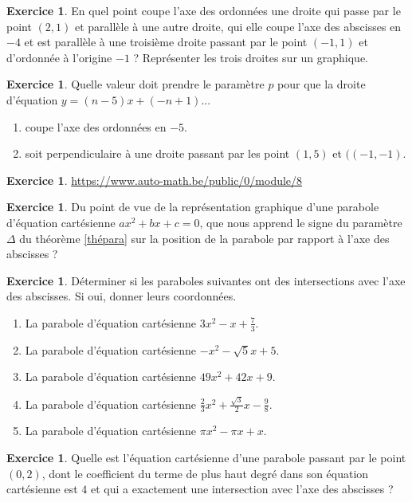\documentclass[a4paper,13pt]{scrreprt}
\theoremstyle{plain}
\theoremstyle{definition}
\newtheorem{exo}[subsection]{Exercice}
\begin{document}
\begin{exo} \label{exop6}
	En quel point coupe l'axe des ordonnées une droite qui passe par le point $(2,1)$ et parallèle à une autre droite, qui elle coupe l'axe des abscisses en $-4$ et est parallèle à une troisième droite passant par le point $(-1,1)$ et d'ordonnée à l'origine $-1$ ? Représenter les trois droites sur un graphique.
\end{exo}

\begin{exo} \label{exop7}
	Quelle valeur doit prendre le paramètre $p$ pour que la droite d'équation $y=(n-5)x+(-n+1)$...
	\begin{enumerate}
		\item coupe l'axe des ordonnées en $-5$.
		\item soit perpendiculaire à une droite passant par les point $(1,5)$ et $((-1,-1)$.
	\end{enumerate}
\end{exo}

\begin{exo} \label{exop8}
	\url{https://www.auto-math.be/public/0/module/8}
\end{exo}

\begin{exo} \label{exop9}
	Du point de vue de la représentation graphique d'une parabole d'équation cartésienne $ax^2+bx+c=0$, que nous apprend le signe du paramètre $\Delta$ du théorème \ref{thépara} sur la position de la parabole par rapport à l'axe des abscisses ?
\end{exo}

\begin{exo} \label{exop10}
	Déterminer si les paraboles suivantes ont des intersections avec l'axe des abscisses. Si oui, donner leurs coordonnées.
	\begin{enumerate}
		\item La parabole d'équation cartésienne $3x^2-x+\frac{7}{3}$.
		\item La parabole d'équation cartésienne $-x^2-\sqrt{5}x+5$.
		\item La parabole d'équation cartésienne $49x^2+42x+9$.
		\item La parabole d'équation cartésienne $\frac{2}{3}x^2 + \frac{\sqrt{3}}{2} x - \frac{9}{8}$.
		\item La parabole d'équation cartésienne $\pi x^2 - \pi x + x$.
	\end{enumerate}
\end{exo}

\begin{exo} \label{exop11}
	Quelle est l'équation cartésienne d'une parabole passant par le point $(0,2)$, dont le coefficient du terme de plus haut degré dans son équation cartésienne est $4$ et qui a exactement une intersection avec l'axe des abscisses ?
\end{exo}
\end{document}
